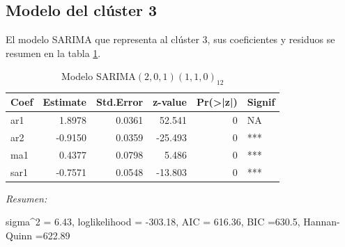 \documentclass[12pt,oneside]{book}\usepackage[]{graphicx}\usepackage[]{color}
\newenvironment{knitrout}{}{} %
\theoremstyle{definition} %
\begin{document}
\subsection{Modelo del clúster 3}

El modelo SARIMA que representa al clúster 3, sus coeficientes y residuos se resumen en la tabla \ref{tab:sarima_cl3}.



\begin{knitrout}
\color{fgcolor}\begin{table}

\caption{\label{tab:unnamed-chunk-83}\label{tab:sarima_cl3}Modelo SARIMA$(2,0,1)(1,1,0)_{12}$}
\centering
\begin{threeparttable}
\begin{tabular}[t]{lrrrrl}
\toprule
Coef & Estimate & Std.Error & z-value & Pr(>|z|) & Signif\\
\midrule
\rowcolor{gray!6}  ar1 & 1.8978 & 0.0361 & 52.541 & 0 & NA\\
ar2 & -0.9150 & 0.0359 & -25.493 & 0 & ***\\
\rowcolor{gray!6}  ma1 & 0.4377 & 0.0798 & 5.486 & 0 & ***\\
sar1 & -0.7571 & 0.0548 & -13.803 & 0 & ***\\
\bottomrule
\end{tabular}
\begin{tablenotes}
\item \textit{Resumen:} 
\item sigma\textasciicircum{}2 = 6.43, loglikelihood = -303.18, AIC = 616.36, BIC =630.5, Hannan-Quinn =622.89
\end{tablenotes}
\end{threeparttable}
\end{table}


\end{knitrout}
\end{document}
